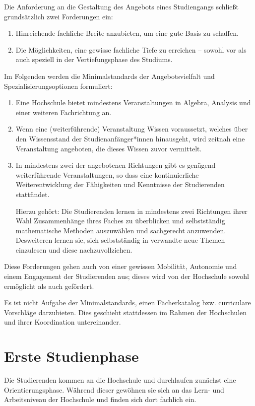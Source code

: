 Die Anforderung an die Gestaltung des Angebots eines Studiengangs schließt grundsätzlich zwei Forderungen ein:
\begin{enumerate}
  \item Hinreichende fachliche Breite anzubieten, um eine gute Basis zu schaffen.
  \item Die Möglichkeiten, eine gewisse fachliche Tiefe zu erreichen -- sowohl vor als auch speziell in der Vertiefungsphase des Studiums.
\end{enumerate}
Im Folgenden werden die Minimalstandards der Angebotsvielfalt und Spezialisierungsoptionen formuliert:
\begin{enumerate}
  \item Eine Hochschule bietet mindestens Veranstaltungen in Algebra, Analysis und einer weiteren Fachrichtung an.
  \item Wenn eine (weiterführende) Veranstaltung Wissen voraussetzt, welches über den Wissensstand der Studienanfänger*innen hinausgeht, wird zeitnah eine Veranstaltung angeboten, die dieses Wissen zuvor vermittelt.
  \item In mindestens zwei der angebotenen Richtungen gibt es genügend weiterführende Veranstaltungen, so dass eine kontinuierliche Weiterentwicklung der Fähigkeiten und Kenntnisse der Studierenden stattfindet.

  Hierzu gehört: Die Studierenden lernen in mindestens zwei Richtungen ihrer Wahl Zusammenhänge ihres Faches zu überblicken und selbstständig mathematische Methoden auszuwählen und sachgerecht anzuwenden. Desweiteren lernen sie, sich selbstständig in verwandte neue Themen einzulesen und diese nachzuvollziehen.
\end{enumerate}
Diese Forderungen gehen auch von einer gewissen Mobilität, Autonomie und einem Engagement der Studierenden aus; dieses wird von der Hochschule sowohl ermöglicht als auch gefördert.

Es ist nicht Aufgabe der Minimalstandards, einen Fächerkatalog bzw. curriculare Vorschläge darzubieten. Dies geschieht stattdessen im Rahmen der Hochschulen und ihrer Koordination untereinander.

\section{Erste Studienphase}

Die Studierenden kommen an die Hochschule und durchlaufen zunächst eine Orientierungsphase. Während dieser gewöhnen sie sich an das Lern- und Arbeitsniveau der Hochschule und finden sich dort fachlich ein.

